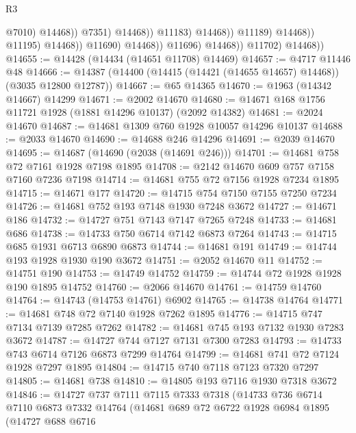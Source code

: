 \begin{lexlean}{R3}
\begin{coremodule}
                                                    @7010)
                                                  @14468))
                                              @7351)
                                            @14468))
                                        @11183)
                                      @14468))
                                  @11189)
                                @14468))
                            @11195)
                          @14468))
                      @11690)
                    @14468))
                @11696)
              @14468))
          @11702)
        @14468))
@14655 := @14428 (@14434 (@14651 @11708) @14469)
@14657 := @4717 @11446 @48
@14666 := @14387 (@14400 (@14415 (@14421 (@14655 @14657) @14468)) (@3035 @12800 @12787))
@14667 := @65 @14365
@14670 := @1963 (@14342 @14667) @14299
@14671 := @2002 @14670
@14680 := @14671 @168 @1756 @11721 @1928 (@1881 @14296 @10137) (@2092 @14382)
@14681 := @2024 @14670
@14687 := @14681 @1309 @760 @1928 @10057 @14296 @10137
@14688 := @2033 @14670
@14690 := @14688 @246 @14296
@14691 := @2039 @14670
@14695 := @14687 (@14690 (@2038 (@14691 @246)))
@14701 := @14681 @758 @72 @7161 @1928 @7198 @1895
@14708 := @2142 @14670 @609 @757 @7158 @7160 @7236 @7198
@14714 := @14681 @755 @72 @7156 @1928 @7234 @1895
@14715 := @14671 @177
@14720 := @14715 @754 @7150 @7155 @7250 @7234
@14726 := @14681 @752 @193 @7148 @1930 @7248 @3672
@14727 := @14671 @186
@14732 := @14727 @751 @7143 @7147 @7265 @7248
@14733 := @14681 @686
@14738 := @14733 @750 @6714 @7142 @6873 @7264
@14743 := @14715 @685 @1931 @6713 @6890 @6873
@14744 := @14681 @191
@14749 := @14744 @193 @1928 @1930 @190 @3672
@14751 := @2052 @14670 @11
@14752 := @14751 @190
@14753 := @14749 @14752
@14759 := @14744 @72 @1928 @1928 @190 @1895 @14752
@14760 := @2066 @14670
@14761 := @14759 @14760
@14764 := @14743 (@14753 @14761) @6902
@14765 := @14738 @14764
@14771 := @14681 @748 @72 @7140 @1928 @7262 @1895
@14776 := @14715 @747 @7134 @7139 @7285 @7262
@14782 := @14681 @745 @193 @7132 @1930 @7283 @3672
@14787 := @14727 @744 @7127 @7131 @7300 @7283
@14793 := @14733 @743 @6714 @7126 @6873 @7299 @14764
@14799 := @14681 @741 @72 @7124 @1928 @7297 @1895
@14804 := @14715 @740 @7118 @7123 @7320 @7297
@14805 := @14681 @738
@14810 := @14805 @193 @7116 @1930 @7318 @3672
@14846 := @14727
    @737
    @7111
    @7115
    @7333
    @7318
    (@14733
      @736
      @6714
      @7110
      @6873
      @7332
      @14764
      (@14681
        @689
        @72
        @6722
        @1928
        @6984
        @1895
        (@14727
          @688
          @6716

\end{coremodule}
\end{lexlean}

